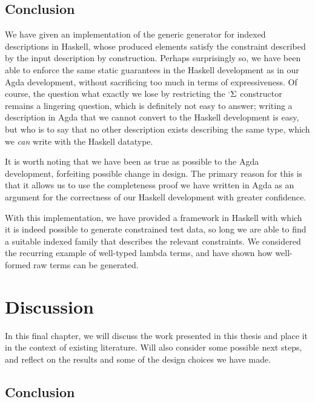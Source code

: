 \documentclass[a4paper,msc,twosized=semi]{uustthesis}
\let\oldemph\emph
\renewcommand\emph[1]{{\large\oldemph{#1}}}
\newcommand*{\mathcolor}{}
\def\mathcolor#1#{\mathcoloraux{#1}}
\newcommand*{\mathcoloraux}[3]{%
  \protect\leavevmode
  \begingroup
    \color#1{#2}#3%
  \endgroup
}
\newcommand{\HSSpecial}[1]{\mathcolor{hsblue4}{#1}}
\begin{document}
\section*{Conclusion}

  We have given an implementation of the generic generator for indexed descriptions in 
  Haskell, whose produced elements satisfy the constraint described by the input 
  description by construction. Perhaps surprisingly so, we have been able to enforce 
  the same static guarantees in the Haskell development as in our Agda development, 
  without sacrificing too much in terms of expressiveness. Of course, the question 
  what exactly we lose by restricting the \ensuremath{\HSSpecial{`}\Sigma } constructor remains a lingering 
  question, which is definitely not easy to answer; writing a description in Agda that 
  we cannot convert to the Haskell development is easy, but who is to say that no 
  other description exists describing the same type, which we \emph{can} write with 
  the Haskell datatype. 

  It is worth noting that we have been as true as possible to the Agda development, 
  forfeiting possible change in design. The primary reason for this is that it allows 
  us to use the completeness proof we have written in Agda as an argument for the 
  correctness of our Haskell development with greater confidence. 

  With this implementation, we have provided a framework in Haskell with which it is 
  indeed possible to generate constrained test data, so long we are able to find a 
  suitable indexed family that describes the relevant constraints. We considered the 
  recurring example of well-typed lambda terms, and have shown how well-formed raw 
  terms can be generated. 

\chapter{Discussion}
In this final chapter, we will discuss the work presented in this thesis and place it in the context of existing literature. Will also consider some possible next steps, and reflect on the results and some of the design choices we have made. 

\section{Conclusion}
\end{document}
